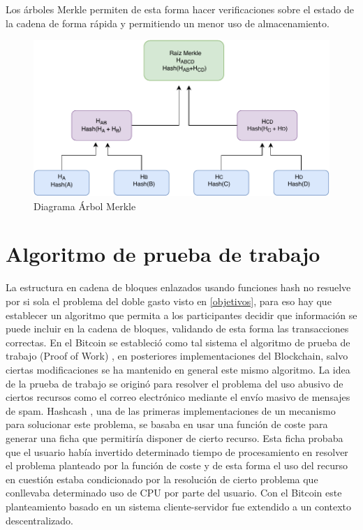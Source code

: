 Los árboles Merkle permiten de esta forma hacer verificaciones sobre el estado de la cadena de forma rápida y permitiendo un menor uso de almacenamiento.

\begin{figure}[H]
  \begin{center}
  \includegraphics[width=14cm]{figures/Merkle_tree.pdf}
  \end{center}
  \caption{Diagrama Árbol Merkle}%

	\label{fig:merkle_tree}%
\end{figure}

\section{Algoritmo de prueba de trabajo}\label{chap3:pow}
La estructura en cadena de bloques enlazados usando funciones hash no resuelve por si sola el problema del doble gasto visto en \ref{objetivos}, para eso hay que establecer un algoritmo que permita a los participantes decidir que información se puede incluir en la cadena de bloques, validando de esta forma las transacciones correctas. En el Bitcoin se estableció como tal sistema el algoritmo de prueba de trabajo (Proof of Work) \citep{bitcoin}, en posteriores implementaciones del Blockchain, salvo ciertas modificaciones se ha mantenido en general este mismo algoritmo. La idea de la prueba de trabajo se originó para resolver el problema del uso abusivo de ciertos recursos como el correo electrónico mediante el envío masivo de mensajes de spam. Hashcash \citep{hashcash}, una de las primeras implementaciones de un mecanismo para solucionar este problema, se basaba en usar una función de coste para generar una ficha que permitiría disponer de cierto recurso. Esta ficha probaba que el usuario había invertido determinado tiempo de procesamiento en resolver el problema planteado por la función de coste y de esta forma el uso del recurso en cuestión estaba condicionado por la resolución de cierto problema que conllevaba determinado uso de CPU por parte del usuario. Con el Bitcoin este planteamiento basado en un sistema cliente-servidor fue extendido a un contexto descentralizado.

